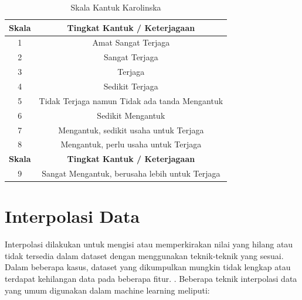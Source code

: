 \begin{longtable}{|c|c|}
  \caption{Skala Kantuk Karolinska \parencite{19}}
  \label{tb:Skala}                                                \\
  \hline
  \rowcolor[HTML]{C0C0C0}
  \textbf{Skala} & \textbf{Tingkat Kantuk / Keterjagaan}          \\
  \hline

  1              & Amat Sangat Terjaga                            \\
  

  2              & Sangat Terjaga                                 \\
  

  3              & Terjaga                                        \\
  

  4              & Sedikit Terjaga                                \\
  

  5              & Tidak Terjaga namun Tidak ada tanda Mengantuk  \\
  

  6              & Sedikit Mengantuk                              \\
  

  7              & Mengantuk, sedikit usaha untuk Terjaga         \\
  

  8              & Mengantuk, perlu usaha untuk Terjaga           \\
  \hline

  \rowcolor[HTML]{C0C0C0}
  \textbf{Skala} & \textbf{Tingkat Kantuk / Keterjagaan}          \\
  \hline
  9              & Sangat Mengantuk, berusaha lebih untuk Terjaga \\
  \hline
\end{longtable}
\section{Interpolasi Data}

Interpolasi dilakukan untuk mengisi atau memperkirakan nilai yang hilang atau
tidak tersedia dalam dataset dengan menggunakan teknik-teknik yang sesuai. Dalam
beberapa kasus, dataset yang dikumpulkan mungkin tidak lengkap atau terdapat
kehilangan data pada beberapa fitur. \parencite{24}. Beberapa teknik interpolasi
data yang umum digunakan dalam machine learning meliputi:

